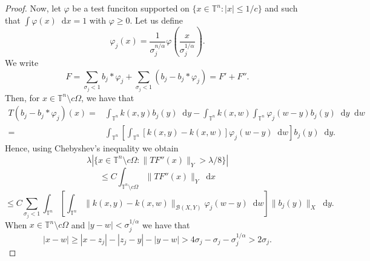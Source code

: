 \documentclass[12pt, reqno]{amsart}
\theoremstyle{definition}
\theoremstyle{remark}
\numberwithin{equation}{section}
\newcommand*\diff{\mathop{}\!\mathrm{d}}
\begin{document}
\begin{proof}
    Now, let $\varphi$ be a test funciton supported on $\{x \in \mathbb{T}^n : |x| \leq 1/c\}$ and such that $\int\varphi(x) \diff x = 1$ with $\varphi \geq 0$. Let us define 
    \begin{equation*}
        \varphi_j(x) = \frac{1}{\sigma_j^{n/\alpha}} \varphi\left( \frac{x}{\sigma_j^{1/\alpha}} \right).
    \end{equation*}
    We write 
    \begin{equation*}
        F = \sum_{\sigma_j < 1}b_j *\varphi_j + \sum_{\sigma_j<1}(b_j - b_j * \varphi_j) = F' + F'' .
    \end{equation*}
    Then, for $x \in\mathbb{T}^n \setminus c\Omega $, we have that
    \begin{align*}
        T(b_j - b_j * \varphi_j)(x) = & \int_{\mathbb{T}^n}k(x, y)b_j(y)\diff y - \int_{\mathbb{T}^n}k(x, w) \int_{\mathbb{T}^n} \varphi_j(w-y)b_j(y)\diff y \diff w \\
        = & \int_{\mathbb{T}^n}\left[\int_{\mathbb{T}^n}[k(x, y) - k(x, w)]\varphi_j(w-y)\diff w\right] b_j(y)\diff y.
    \end{align*}
    Hence, using Chebyshev's inequality we obtain
    \begin{equation}
        \lambda |\{x \in \mathbb{T}^n \setminus c\Omega : \|TF''(x)\|_Y > \lambda/8\}| 
        \label{eq:TF''}
    \end{equation}
    \begin{equation*}
        \leq  C\int_{\mathbb{T}^n \setminus c\Omega}\|TF''(x)\|_Y \diff x
    \end{equation*}
    \begin{equation*}
        \leq  C \sum_{\sigma_j< 1}\int_{\mathbb{T}^n}\left[\int_{\mathbb{T}^n}\|k(x, y) - k(x, w)\|_{\mathcal{B}(X,Y)}\varphi_j(w-y)\diff w\right] \|b_j(y)\|_X\diff y.
    \end{equation*}
    When $x \in \mathbb{T}^n \setminus c\Omega$ and $|y - w| < \sigma_j^{1/\alpha}$ we have that
    \begin{equation*}
        |x-w| \geq |x-z_j| - |z_j - y| - |y - w| > 4\sigma_j - \sigma_j - \sigma_j^{1/\alpha} > 2\sigma_j.
    \end{equation*}


\end{proof}
\end{document}
